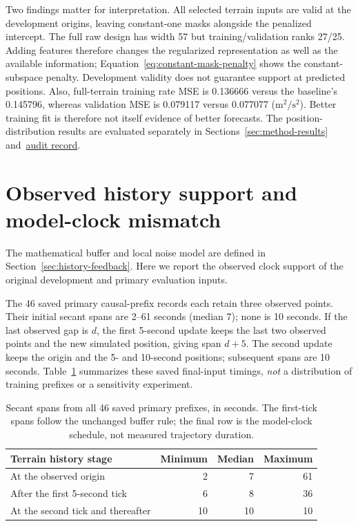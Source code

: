 Two findings matter for interpretation. All selected terrain inputs are
valid at the development origins, leaving constant-one masks alongside the
penalized intercept. The full raw design has width 57 but training/validation
ranks 27/25. Adding features therefore changes the regularized representation
as well as the available information; Equation~\eqref{eq:constant-mask-penalty}
shows the constant-subspace penalty. Development validity does not guarantee
support at predicted positions. Also, full-terrain training rate MSE is
0.136666 versus the baseline's 0.145796, whereas validation MSE is 0.079117
versus 0.077077 (\(\mathrm{m}^2/\mathrm{s}^2\)). Better training fit is therefore
not itself evidence of better forecasts. The position-distribution results
are evaluated separately in Sections~\ref{sec:method-results}
and~\href{audit-notes.pdf\#sec:terrain-results}{audit record}.


\section{Observed history support and model-clock mismatch}
\label{sec:empirical-history-timings}\hypertarget{sec:empirical-history-timings}{}
The mathematical buffer and local noise model are defined in
Section~\ref{sec:history-feedback}. Here we report the observed clock
support of the original development and primary evaluation inputs.

The 46 saved primary causal-prefix records each retain three observed points.
Their initial secant spans are 2--61 seconds (median 7); none is 10 seconds.
If the last observed gap is \(d\), the first 5-second update keeps the last
two observed points and the new simulated position, giving span \(d+5\).
The second update keeps the origin and the 5- and 10-second positions;
subsequent spans are 10 seconds. Table~\ref{tab:history-spans} summarizes
these saved final-input timings, \emph{not} a distribution of training
prefixes or a sensitivity experiment.

\begin{table}[htbp]
\centering\small
\caption{Secant spans from all 46 saved primary prefixes, in seconds.
The first-tick spans follow the unchanged buffer rule; the final row is
the model-clock schedule, not measured trajectory duration.}
\label{tab:history-spans}\hypertarget{tab:history-spans}{}
\begin{tabular}{lrrr}
\toprule
Terrain history stage & Minimum & Median & Maximum\\
\midrule
At the observed origin & 2 & 7 & 61\\
After the first 5-second tick & 6 & 8 & 36\\
At the second tick and thereafter & 10 & 10 & 10\\
\bottomrule
\end{tabular}
\end{table}

